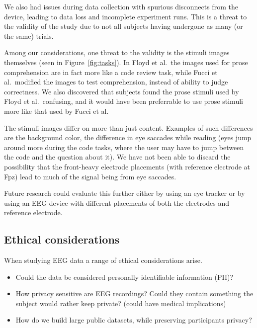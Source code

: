     We also had issues during data collection with spurious disconnects from the device, leading to data loss and incomplete experiment runs. This is a threat to the validity of the study due to not all subjects having undergone as many (or the same) trials.

    Among our considerations, one threat to the validity is the stimuli images themselves (seen in Figure~\ref{fig:tasks}). In Floyd et al.~the images used for prose comprehension are in fact more like a code review task, while Fucci et al.~modified the images to test comprehension, instead of ability to judge correctness. We also discovered that subjects found the prose stimuli used by Floyd et al.~confusing, and it would have been preferrable to use prose stimuli more like that used by Fucci et al.

    The stimuli images differ on more than just content. Examples of such differences are the background color, the difference in eye saccades while reading (eyes jump around more during the code tasks, where the user may have to jump between the code and the question about it). We have not been able to discard the possibility that the front-heavy electrode placements (with reference electrode at Fpz) lead to much of the signal being from eye saccades. 

    Future research could evaluate this further either by using an eye tracker or by using an EEG device with different placements of both the electrodes and reference electrode.


\subsection{Ethical considerations}

    When studying EEG data a range of ethical considerations arise. 

    \begin{itemize}
        \item Could the data be considered personally identifiable information (PII)? 
        \item How privacy sensitive are EEG recordings? Could they contain something the subject would rather keep private? (could have medical implications)
        \item How do we build large public datasets, while preserving participants privacy?
    \end{itemize}

